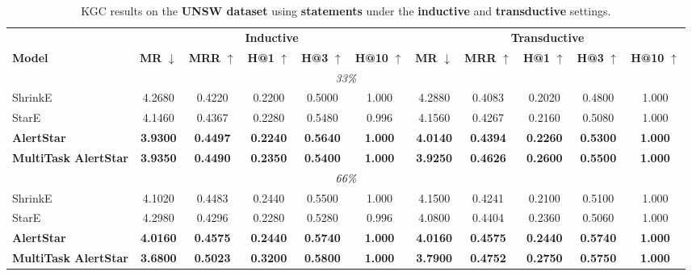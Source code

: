 \documentclass[10pt,journal,compsoc]{IEEEtran}
\begin{document}
\begin{table}[t]
\tiny
\centering
\caption{KGC results on the \textbf{UNSW dataset} using \textbf{statements} under the \textbf{inductive} and \textbf{transductive} settings.}
\label{tab:kgc_statements_unsw}
\begin{tabular}{l ccccc ccccc}
\toprule
 & \multicolumn{5}{c}{\textbf{Inductive}} & \multicolumn{5}{c}{\textbf{Transductive}} \\
\cmidrule(lr){2-6} \cmidrule(lr){7-11}
\textbf{Model} & \textbf{MR} $\downarrow$ & \textbf{MRR} $\uparrow$ & \textbf{H@1} $\uparrow$ & \textbf{H@3} $\uparrow$ & \textbf{H@10} $\uparrow$ & \textbf{MR} $\downarrow$ & \textbf{MRR} $\uparrow$ & \textbf{H@1} $\uparrow$ & \textbf{H@3} $\uparrow$ & \textbf{H@10} $\uparrow$ \\
\midrule

\multicolumn{11}{c}{\textit{33\%}} \\
\cmidrule{1-11}
ShrinkE         & 4.2680 & 0.4220 & 0.2200 & 0.5000 & 1.000 & 4.2880 & 0.4083 & 0.2020 & 0.4800 & 1.000 \\
StarE           & 4.1460 & 0.4367 & 0.2280 & 0.5480 & 0.996 & 4.1560 & 0.4267 & 0.2160 & 0.5080 & 1.000 \\
\textbf{AlertStar}       & \textbf{3.9300} & \textbf{0.4497} & \textbf{0.2240} & \textbf{0.5640} & \textbf{1.000} & \textbf{4.0140} & \textbf{0.4394} & \textbf{0.2260} & \textbf{0.5300} & \textbf{1.000} \\
\textbf{MultiTask AlertStar} & \textbf{3.9350} & \textbf{0.4490} & \textbf{0.2350} & \textbf{0.5400} & \textbf{1.000} & \textbf{3.9250} & \textbf{0.4626} & \textbf{0.2600} & \textbf{0.5500} & \textbf{1.000} \\
\midrule


\multicolumn{11}{c}{\textit{66\%}} \\
\cmidrule{1-11}
ShrinkE         & 4.1020 & 0.4483 & 0.2440 & 0.5500 & 1.000 & 4.1500 & 0.4241 & 0.2100 & 0.5100 & 1.000 \\
StarE           & 4.2980 & 0.4296 & 0.2280 & 0.5280 & 0.996 & 4.0800 & 0.4404 & 0.2360 & 0.5060 & 1.000 \\
\textbf{AlertStar}       & \textbf{4.0160} & \textbf{0.4575} & \textbf{0.2440} & \textbf{0.5740} & \textbf{1.000} & \textbf{4.0160} & \textbf{0.4575} & \textbf{0.2440} & \textbf{0.5740} & \textbf{1.000} \\
\textbf{MultiTask AlertStar} & \textbf{3.6800} & \textbf{0.5023} & \textbf{0.3200} & \textbf{0.5800} & \textbf{1.000} & \textbf{3.7900} & \textbf{0.4752} & \textbf{0.2750} & \textbf{0.5750} & \textbf{1.000} \\
\midrule



\end{tabular}
\end{table}
\end{document}
